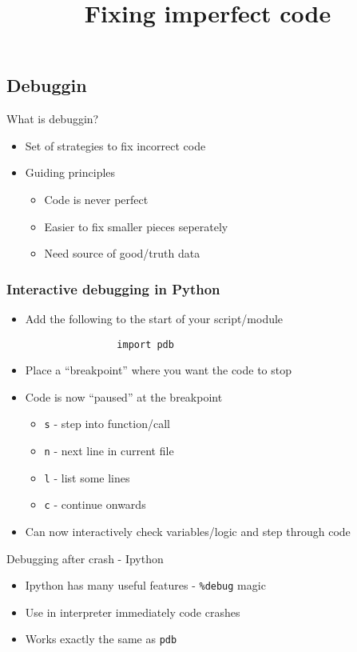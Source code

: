 \documentclass[11pt,professionalfonts]{beamer}
\title[Debugging]{\large \textbf{Fixing imperfect code}}
\author{\vspace*{-0.3cm}}
\institute{
  \footnotesize
  {\normalsize\bf{Shankar Kulumani}}\\
  \vspace*{0.2cm}
    \textbf{Flight Dynamics \& Control Lab}\\ \vspace*{0.5cm}
  \begin{figure} %
        \texttt{[image: figures/gw\_txh\_2cs\_pos.pdf]}
    \end{figure}
}
\date{}
\begin{document}

\setcounter{framenumber}{-1}
\begin{frame} %
  \titlepage
\end{frame}   %

\section*{}
\subsection*{Debuggin}  
\begin{frame}{What is debuggin?}
    \begin{itemize}
        \item Set of strategies to fix incorrect code
        \item Guiding principles
            \begin{itemize}
                \item Code is never perfect
                \item Easier to fix smaller pieces seperately
                \item Need source of good/truth data
            \end{itemize}
    \end{itemize}
\end{frame}

\begin{frame}[fragile]\frametitle{Interactive debugging in Python}
    \begin{itemize}
        \item Add the following to the start of your script/module
            \begin{verbatim}
                import pdb
            \end{verbatim}
        \item Place a ``breakpoint'' where you want the code to stop
        \item Code is now ``paused'' at the breakpoint
            \begin{itemize}
                \item \texttt{s} - step into function/call
                \item \texttt{n} - next line in current file
                \item \texttt{l} - list some lines
                \item \texttt{c} - continue onwards
            \end{itemize}
        \item Can now interactively check variables/logic and step through code
    \end{itemize}
\end{frame}

\begin{frame}{Debugging after crash - Ipython}
    \begin{itemize}
        \item Ipython has many useful features - \texttt{\%debug} magic
            \item Use in interpreter immediately code crashes
            \item Works exactly the same as \texttt{pdb}
    \end{itemize}
\end{frame}
\end{document}
